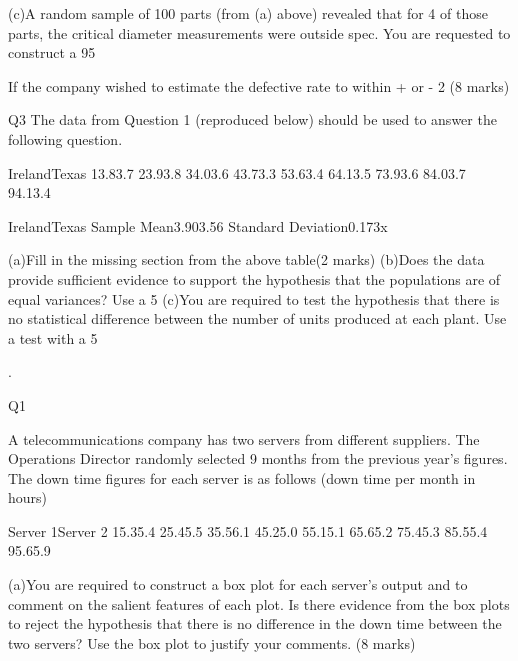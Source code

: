 			
			
			
			
			
			
			
			(c)A random sample of 100 parts (from (a) above) revealed that for 4 of those parts, the critical diameter measurements were outside spec.  You are requested to construct a 95%
			
			If the company wished to estimate the defective rate to within + or - 2%
			(8 marks)
			
			
			
			
			Q3
			The data from Question 1 (reproduced below) should be used to answer the following question.
			
			IrelandTexas
			13.83.7
			23.93.8
			34.03.6
			43.73.3
			53.63.4
			64.13.5
			73.93.6
			84.03.7
			94.13.4
			
			
			
			IrelandTexas
			Sample Mean3.903.56
			Standard Deviation0.173x
			
			(a)Fill in the missing section from the above table(2 marks)
			(b)Does the data provide sufficient evidence to support the hypothesis that the populations are of equal variances?  Use a 5%
			(c)You are required to test the hypothesis that there is no statistical difference between the number of units produced at each plant.  Use a test with a 5%
			
			
			
			
			
			.
			
			
			
			
			
			Q1
			
			A telecommunications company has two servers from different suppliers. The Operations Director randomly selected 9 months from the previous year’s figures.  The down time figures for each server is as follows (down time per month in hours)
			
			
			Server 1Server 2
			15.35.4
			25.45.5
			35.56.1
			45.25.0
			55.15.1
			65.65.2
			75.45.3
			85.55.4
			95.65.9
			
			
			(a)You are required to construct a box plot for each server’s output and to comment on the salient features of each plot.  Is there evidence from the box plots to reject the hypothesis that there is no difference in the down time between the two servers?  Use the box plot to justify your comments. (8 marks)
			
